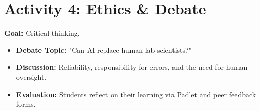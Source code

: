 \documentclass[11pt, a4paper]{article}
\begin{document}
\section{Activity 4: Ethics \& Debate}
\textbf{Goal:} Critical thinking.
\begin{itemize}
    \item \textbf{Debate Topic:} "Can AI replace human lab scientists?"
    \item \textbf{Discussion:} Reliability, responsibility for errors, and the need for human oversight.
    \item \textbf{Evaluation:} Students reflect on their learning via Padlet and peer feedback forms.
\end{itemize}
\end{document}
